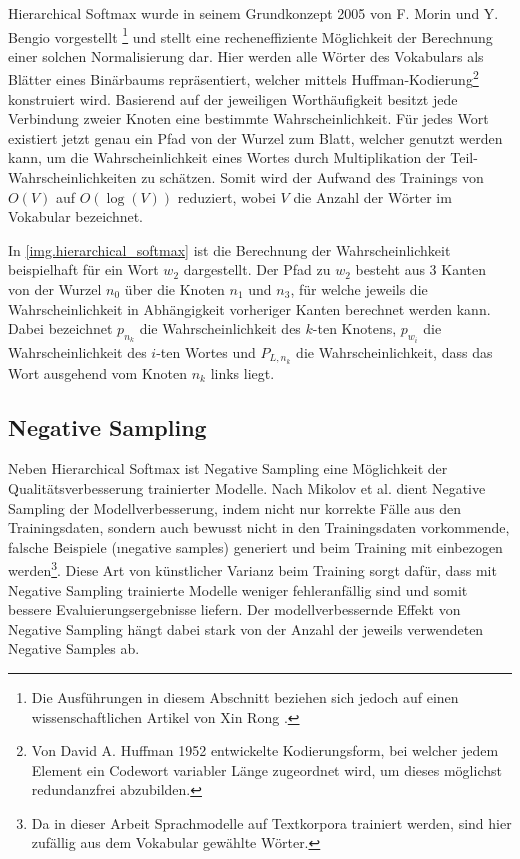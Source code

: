 Hierarchical Softmax wurde in seinem Grundkonzept 2005 von F. Morin und Y. Bengio vorgestellt \citep{Morin2005}\footnote{Die Ausführungen in diesem Abschnitt beziehen sich jedoch auf einen wissenschaftlichen Artikel von Xin Rong \citep{Rong}.} und stellt eine recheneffiziente Möglichkeit der Berechnung einer solchen Normalisierung dar. Hier werden alle Wörter des Vokabulars als Blätter eines Binärbaums repräsentiert, welcher mittels Huffman-Kodierung\footnote{Von David A. Huffman 1952 entwickelte Kodierungsform, bei welcher jedem Element ein Codewort variabler Länge zugeordnet wird, um dieses möglichst redundanzfrei abzubilden.} konstruiert wird. Basierend auf der jeweiligen Worthäufigkeit besitzt jede Verbindung zweier Knoten eine bestimmte Wahrscheinlichkeit. Für jedes Wort existiert jetzt genau ein Pfad von der Wurzel zum Blatt, welcher genutzt werden kann, um die Wahrscheinlichkeit eines Wortes durch Multiplikation der Teil-Wahrscheinlichkeiten zu schätzen. Somit wird der Aufwand des Trainings von $O(V)$ auf $O(\log(V))$ reduziert, wobei $V$ die Anzahl der Wörter im Vokabular bezeichnet.

In \autoref{img.hierarchical_softmax} ist die Berechnung der Wahrscheinlichkeit beispielhaft für ein Wort $w_2$ dargestellt. Der Pfad zu $w_2$ besteht aus 3 Kanten von der Wurzel $n_0$ über die Knoten $n_1$ und $n_3$, für welche jeweils die Wahrscheinlichkeit in Abhängigkeit vorheriger Kanten berechnet werden kann. Dabei bezeichnet $p_{n_k}$ die Wahrscheinlichkeit des $k$-ten Knotens, $p_{w_i}$ die Wahrscheinlichkeit des $i$-ten Wortes und $P_{L,n_k}$ die Wahrscheinlichkeit, dass das Wort ausgehend vom Knoten $n_k$ links liegt.



\subsection{Negative Sampling}\label{ss.negative_sampling}
Neben Hierarchical Softmax ist Negative Sampling eine Möglichkeit der Qualitätsverbesserung trainierter Modelle. Nach Mikolov et al. \citep{Mikolov2013Dist} dient Negative Sampling der Modellverbesserung, indem nicht nur korrekte Fälle aus den Trainingsdaten, sondern auch bewusst nicht in den Trainingsdaten vorkommende, falsche Beispiele (\i{negative samples}) generiert und beim Training mit einbezogen werden\footnote{Da in dieser Arbeit Sprachmodelle auf Textkorpora trainiert werden, sind  hier zufällig aus dem Vokabular gewählte Wörter.}. Diese Art von künstlicher Varianz beim Training sorgt dafür, dass mit Negative Sampling trainierte Modelle weniger fehleranfällig sind und somit bessere Evaluierungsergebnisse liefern. Der modellverbessernde Effekt von Negative Sampling hängt dabei stark von der Anzahl der jeweils verwendeten Negative Samples ab.

